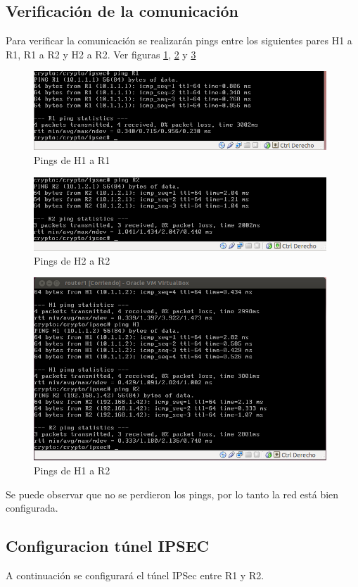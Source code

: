 \documentclass[a4paper,10pt]{article}
\begin{document}
		\subsection{Verificación de la comunicación}
	\indent Para verificar la comunicaci\'on se realizar\'an pings entre los siguientes pares H1 a R1, R1 a R2 y H2 a R2. Ver figuras \ref{img018}, \ref{img019} y \ref{img020}
	\begin{figure}[H]
		\centering
		\includegraphics[width=11cm]{Imagenes/pingH1aR1.png}
		\caption{Pings de H1 a R1} \label{img018}
	\end{figure}	
	\begin{figure}[H]
		\centering
		\includegraphics[width=11cm]{Imagenes/pingH2aR2.png}
		\caption{Pings de H2 a R2} \label{img019}
	\end{figure}	
	\begin{figure}[H]
		\centering
		\includegraphics[width=11cm]{Imagenes/pingR1aR2.png}
		\caption{Pings de H1 a R2} \label{img020}
	\end{figure}	
	
	\indent Se puede observar que no se perdieron los pings, por lo tanto la red está bien configurada.
	
		\subsection{Configuracion t\'unel IPSEC}
	\indent A continuaci\'on se configurar\'a el t\'unel IPSec entre R1 y R2.
			
\end{document}
